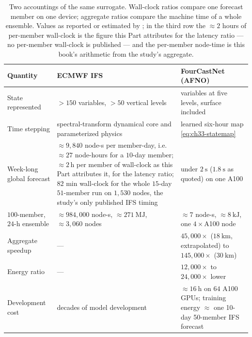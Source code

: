 \begin{table}[htbp]
\centering
\small
\caption{Two accountings of the same surrogate. Wall-clock ratios compare one forecast
member on one device; aggregate ratios compare the machine time of a whole ensemble.
Values as reported or estimated by \cite{pathak2022fourcastnet}; in the third row the
$\approx 2$ hours of per-member wall-clock is the figure this Part attributes for the
latency ratio --- no per-member wall-clock is published --- and the per-member node-time
is this book's arithmetic from the study's aggregate.}
\label{tab:ch33-cost}
\begin{tabular}{@{}>{\raggedright\arraybackslash}p{}>{\raggedright\arraybackslash}p{}>{\raggedright\arraybackslash}p{}@{}}
\toprule
\textbf{Quantity} & \textbf{ECMWF IFS} & \textbf{FourCastNet (AFNO)} \\
\midrule
State represented & $>150$ variables, $>50$ vertical levels & 20 variables at five levels, surface included \\
Time stepping & spectral-transform dynamical core and parameterized physics & learned six-hour map \eqref{eq:ch33-statemap} \\
Week-long global forecast & $\approx 9{,}840$ node-s per member-day, i.e.\ $\approx 27$ node-hours for a $10$-day member; $\approx 2$\,h per member of wall-clock as this Part attributes it, for the latency ratio; $82$ min wall-clock for the whole $15$-day $51$-member run on $1{,}530$ nodes, the study's only published IFS timing & under $2\ \mathrm{s}$ ($1.8\ \mathrm{s}$ as quoted) on one A100 \\
$100$-member, $24$-h ensemble & $\approx 984{,}000$ node-s, $\approx 271\ \mathrm{MJ}$, $\approx 3{,}060$ nodes & $\approx 7$ node-s, $\approx 8\ \mathrm{kJ}$, one $4\times$A100 node \\
Aggregate speedup & --- & $45{,}000\times$ ($18\ \mathrm{km}$, extrapolated) to $145{,}000\times$ ($30\ \mathrm{km}$) \\
Energy ratio & --- & $12{,}000\times$ to $24{,}000\times$ lower \\
Development cost & decades of model development & $\approx 16\ \mathrm{h}$ on $64$ A100 GPUs; training energy $\approx$ one 10-day 50-member IFS forecast \\
\bottomrule
\end{tabular}
\end{table}

